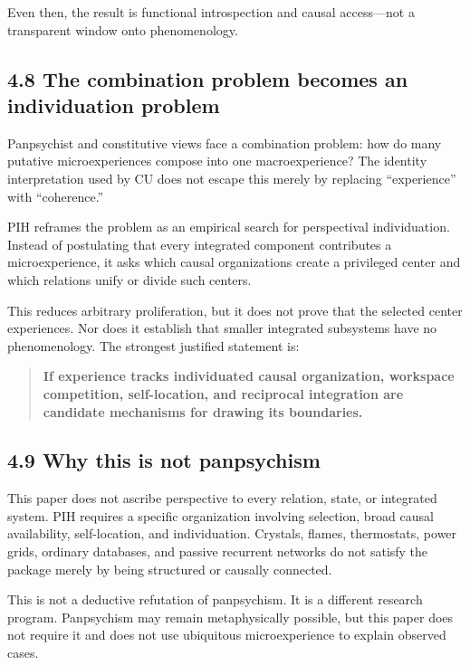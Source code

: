 \documentclass[
  11pt,
]{article}
\begin{document}
Even then, the result is functional introspection and causal
access---not a transparent window onto phenomenology.

\subsection{4.8 The combination problem becomes an individuation
problem}\label{the-combination-problem-becomes-an-individuation-problem}

Panpsychist and constitutive views face a combination problem: how do
many putative microexperiences compose into one macroexperience? The
identity interpretation used by CU does not escape this merely by
replacing ``experience'' with ``coherence.''

PIH reframes the problem as an empirical search for perspectival
individuation. Instead of postulating that every integrated component
contributes a microexperience, it asks which causal organizations create
a privileged center and which relations unify or divide such centers.

This reduces arbitrary proliferation, but it does not prove that the
selected center experiences. Nor does it establish that smaller
integrated subsystems have no phenomenology. The strongest justified
statement is:

\begin{quote}
\textbf{If experience tracks individuated causal organization, workspace
competition, self-location, and reciprocal integration are candidate
mechanisms for drawing its boundaries.}
\end{quote}

\subsection{4.9 Why this is not
panpsychism}\label{why-this-is-not-panpsychism}

This paper does not ascribe perspective to every relation, state, or
integrated system. PIH requires a specific organization involving
selection, broad causal availability, self-location, and individuation.
Crystals, flames, thermostats, power grids, ordinary databases, and
passive recurrent networks do not satisfy the package merely by being
structured or causally connected.

This is not a deductive refutation of panpsychism. It is a different
research program. Panpsychism may remain metaphysically possible, but
this paper does not require it and does not use ubiquitous
microexperience to explain observed cases.
\end{document}
